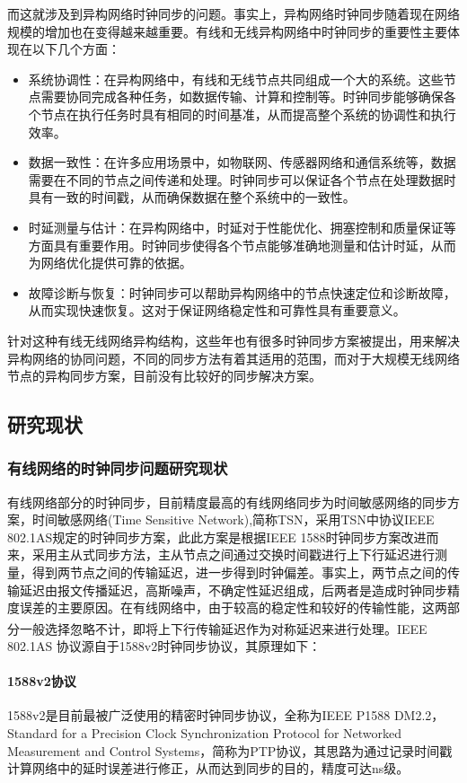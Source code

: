 \documentclass[UTF8,a4paper,12pt]{ctexart}
\numberwithin{equation}{section}
\begin{document}
而这就涉及到异构网络时钟同步的问题。事实上，异构网络时钟同步随着现在网络规模的增加也在变得越来越重要。有线和无线异构网络中时钟同步的重要性主要体现在以下几个方面：
\begin{itemize}
	\item 系统协调性：在异构网络中，有线和无线节点共同组成一个大的系统。这些节点需要协同完成各种任务，如数据传输、计算和控制等。时钟同步能够确保各个节点在执行任务时具有相同的时间基准，从而提高整个系统的协调性和执行效率。
	\item 数据一致性：在许多应用场景中，如物联网、传感器网络和通信系统等，数据需要在不同的节点之间传递和处理。时钟同步可以保证各个节点在处理数据时具有一致的时间戳，从而确保数据在整个系统中的一致性。
	\item 时延测量与估计：在异构网络中，时延对于性能优化、拥塞控制和质量保证等方面具有重要作用。时钟同步使得各个节点能够准确地测量和估计时延，从而为网络优化提供可靠的依据。
	\item 故障诊断与恢复：时钟同步可以帮助异构网络中的节点快速定位和诊断故障，从而实现快速恢复。这对于保证网络稳定性和可靠性具有重要意义。
\end{itemize}

针对这种有线无线网络异构结构，这些年也有很多时钟同步方案被提出，用来解决异构网络的协同问题，不同的同步方法有着其适用的范围，而对于大规模无线网络节点的异构同步方案，目前没有比较好的同步解决方案。

\subsection{研究现状}
\subsubsection{有线网络的时钟同步问题研究现状}

有线网络部分的时钟同步，目前精度最高的有线网络同步为时间敏感网络的同步方案，时间敏感网络(Time Sensitive Network),简称TSN，采用TSN中协议IEEE 802.1AS规定的时钟同步方案，此此方案是根据IEEE 1588时钟同步方案改进而来，采用主从式同步方法，主从节点之间通过交换时间戳进行上下行延迟进行测量，得到两节点之间的传输延迟，进一步得到时钟偏差。事实上，两节点之间的传输延迟由报文传播延迟，高斯噪声，不确定性延迟组成，后两者是造成时钟同步精度误差的主要原因。在有线网络中，由于较高的稳定性和较好的传输性能，这两部分一般选择忽略不计，即将上下行传输延迟作为对称延迟来进行处理\textsuperscript{\cite{teener2008overview}}。IEEE 802.1AS 协议源自于1588v2时钟同步协议，其原理如下：
\paragraph{1588v2协议}
1588v2是目前最被广泛使用的精密时钟同步协议，全称为IEEE P1588 DM2.2， Standard for a Precision Clock Synchronization Protocol for Networked Measurement and Control Systems，简称为PTP协议，其思路为通过记录时间戳计算网络中的延时误差进行修正，从而达到同步的目的，精度可达ns级。
\end{document}
